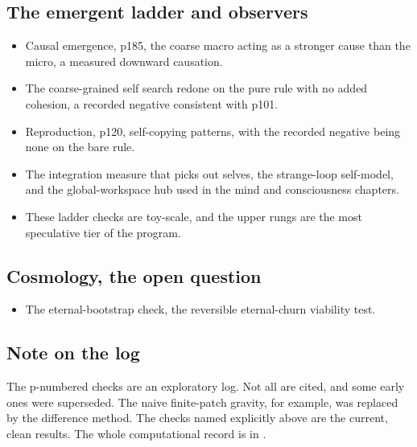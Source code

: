 \subsection{The emergent ladder and observers}

\begin{itemize}
  \item Causal emergence, p185, the coarse macro acting as a stronger cause than the micro, a measured
  downward causation.
  \item The coarse-grained self search redone on the pure rule with no added cohesion, a recorded negative
  consistent with p101.
  \item Reproduction, p120, self-copying patterns, with the recorded negative being none on the bare rule.
  \item The integration measure that picks out selves, the strange-loop self-model, and the global-workspace
  hub used in the mind and consciousness chapters.
  \item These ladder checks are toy-scale, and the upper rungs are the most speculative tier of the program.
\end{itemize}

\subsection{Cosmology, the open question}

\begin{itemize}
  \item The eternal-bootstrap check, the reversible eternal-churn viability test.
\end{itemize}

\subsection{Note on the log}

The p-numbered checks are an exploratory log. Not all are cited, and some early ones were superseded. The naive
finite-patch gravity, for example, was replaced by the difference method. The checks named explicitly above are the
current, clean results. The whole computational record is in \cite{pollard2026vibetest}.
